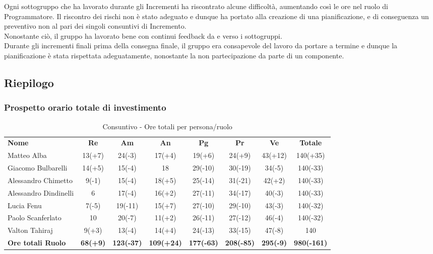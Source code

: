 Ogni sottogruppo che ha lavorato durante gli Incrementi ha riscontrato alcune difficoltà, aumentando così le ore nel ruolo di Programmatore.
Il riscontro dei rischi non è stato adeguato e dunque ha portato alla creazione di una pianificazione, e di conseguenza un preventivo non al pari dei singoli consuntivi di Incremento.\\
Nonostante ciò, il gruppo ha lavorato bene con continui feedback da e verso i sottogruppi.
\\
Durante gli incrementi finali prima della consegna finale, il gruppo era consapevole del lavoro da portare a termine e dunque la pianificazione è stata rispettata adeguatamente, nonostante la non partecipazione da parte di un componente.\\

 



\newpage

\subsection{Riepilogo}

\subsubsection{Prospetto orario totale di investimento}

\begin{table} [h!]
	\begin{center}
		\begin{tabular} { m{3.5cm} c c c c c c c }
			\rowcolor{lightgray}
			\textbf{Nome} & \textbf{Re} & \textbf{Am} & \textbf{An} & \textbf{Pg} & \textbf{Pr} & \textbf{Ve} & \textbf{Totale} \\
			Matteo Alba & 13(+7)& 24(-3)& 17(+4) & 19(+6) & 24(+9) & 43(+12) & 140(+35) \\
			Giacomo Bulbarelli & 14(+5) & 15(-4) & 18 & 29(-10) & 30(-19) & 34(-5) & 140(-33) \\
			Alessandro Chimetto & 9(-1) & 15(-4) & 18(+5) & 25(-14) & 31(-21) & 42(+2) & 140(-33) \\
			Alessandro Dindinelli & 6 & 17(-4) & 16(+2) & 27(-11) & 34(-17)& 40(-3) & 140(-33) \\
			Lucia Fenu & 7(-5) & 19(-11) & 15(+7) & 27(-10) & 29(-10) & 43(-3) & 140(-32) \\
			Paolo Scanferlato & 10 & 20(-7) & 11(+2) & 26(-11) & 27(-12) & 46(-4) & 140(-32) \\
			Valton Tahiraj & 9(+3)& 13(-4) & 14(+4) & 24(-13) & 33(-15) & 47(-8) & 140 \\
			\textbf{Ore totali Ruolo} & \textbf{68(+9)} & \textbf{123(-37)} & \textbf{109(+24)} & \textbf{177(-63)} & \textbf{208(-85)}& \textbf{295(-9)} & \textbf{980(-161)}
		\end{tabular}
		\caption{Consuntivo - Ore totali per persona/ruolo}
	\end{center}
\end{table}


